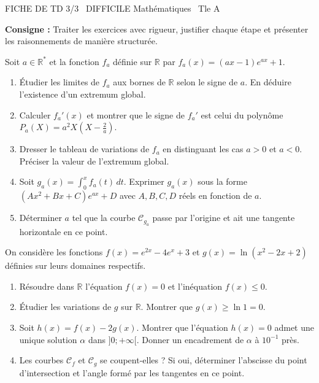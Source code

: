 \documentclass[11pt]{article}
\begin{document}
\begin{tcolorbox}[enhanced,colback=popink,colframe=popink,arc=10pt,boxrule=0pt,left=12pt,right=12pt,top=9pt,bottom=9pt]
{\color{white}\popxbold\small FICHE DE TD 3/3 \textbullet\ DIFFICILE \hfill Mathématiques \textbullet\ Tle A\par}
\end{tcolorbox}
\vspace{4pt}
\noindent\textbf{Consigne :} Traiter les exercices avec rigueur, justifier chaque étape et présenter les raisonnements de manière structurée.

\begin{exercice}
Soit $a \in \mathbb{R}^*$ et la fonction $f_a$ définie sur $\mathbb{R}$ par $f_a(x) = (ax - 1)e^{ax} + 1$.
\begin{enumerate}
    \item Étudier les limites de $f_a$ aux bornes de $\mathbb{R}$ selon le signe de $a$. En déduire l'existence d'un extremum global.
    \item Calculer $f_a'(x)$ et montrer que le signe de $f_a'$ est celui du polynôme $P_a(X) = a^2X(X - \frac{2}{a})$.
    \item Dresser le tableau de variations de $f_a$ en distinguant les cas $a > 0$ et $a < 0$. Préciser la valeur de l'extremum global.
    \item Soit $g_a(x) = \int_0^x f_a(t)\,dt$. Exprimer $g_a(x)$ sous la forme $(Ax^2 + Bx + C)e^{ax} + D$ avec $A,B,C,D$ réels en fonction de $a$.
    \item Déterminer $a$ tel que la courbe $\mathcal{C}_{g_a}$ passe par l'origine et ait une tangente horizontale en ce point.
\end{enumerate}
\end{exercice}

\begin{exercice}
On considère les fonctions $f(x) = e^{2x} - 4e^x + 3$ et $g(x) = \ln(x^2 - 2x + 2)$ définies sur leurs domaines respectifs.
\begin{enumerate}
    \item Résoudre dans $\mathbb{R}$ l'équation $f(x) = 0$ et l'inéquation $f(x) \leqslant 0$.
    \item Étudier les variations de $g$ sur $\mathbb{R}$. Montrer que $g(x) \geqslant \ln 1 = 0$.
    \item Soit $h(x) = f(x) - 2g(x)$. Montrer que l'équation $h(x) = 0$ admet une unique solution $\alpha$ dans $]0; +\infty[$. Donner un encadrement de $\alpha$ à $10^{-1}$ près.
    \item Les courbes $\mathcal{C}_f$ et $\mathcal{C}_g$ se coupent-elles ? Si oui, déterminer l'abscisse du point d'intersection et l'angle formé par les tangentes en ce point.
\end{enumerate}
\end{exercice}
\end{document}
